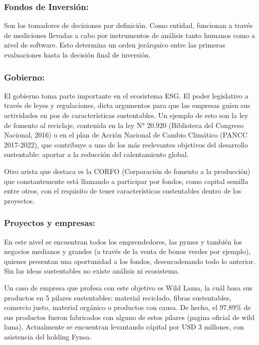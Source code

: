 \documentclass[11pt,letterpaper]{article}
\begin{document}
\subsubsection{Fondos de Inversión:}

Son los tomadores de decisiones por definición. Como entidad, funcionan a través de mediciones llevadas a cabo por instrumentos de análisis tanto humanos como a nivel de software. Esto determina un orden jerárquico entre las primeras evaluaciones hasta la decisión final de inversión.

\subsubsection{Gobierno:}

El gobierno toma parte importante en el ecosistema ESG. El poder legislativo a través de leyes y regulaciones, dicta argumentos para que las empresas guíen sus actividades en pos de características sustentables. Un ejemplo de esto son la ley de fomento al reciclaje, contenida en la ley N° 20.920 (Biblioteca del Congreso Nacional, 2016) o en el plan de Acción Nacional de Cambio Climático (PANCC 2017-2022), que contribuye a uno de los más reelevantes objetivos del desarrollo sustentable: aportar a la reducción del calentamiento global. 

Otro arista que destaca es la CORFO (Corporación de fomento a la producción) que constantemente está llamando a participar por fondos, como capital semilla entre otros, con el requisito de tener características sustentables dentro de los proyectos. 

\subsubsection{Proyectos y empresas:}
En este nivel se encuentran todos los emprendedores, las pymes y también los negocios medianos y grandes (a través de la venta de bonos verdes por ejemplo), quienes presentan una oportunidad a los fondos, desencadenando todo lo anterior. Sin las ideas sustentables no existe análisis ni ecosistema. 

Un caso de empresa que profesa con este objetivo es Wild Lama, la cuál basa sus productos en 5 pilares sustentables: material reciclado, fibras sustentables, comercio justo, material orgánico o productos con causa. De hecho, el 97,89\% de sus productos fueron fabricados con alguno de estos pilares (pagina oficial de wild lama). Actualmente se encuentran levantando cápital por USD 3 millones, con asistencia del holding Fynsa.
\end{document}
